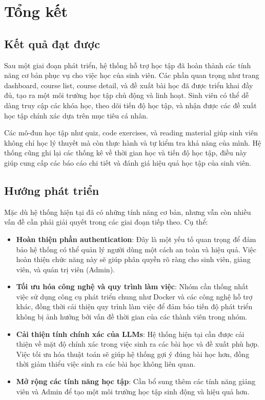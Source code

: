 \chapter{Tổng kết}

\section{Kết quả đạt được}

Sau một giai đoạn phát triển, hệ thống hỗ trợ học tập đã hoàn thành các tính năng cơ bản phục vụ cho việc học của sinh viên. Các phần quan trọng như trang dashboard, course list, course detail, và đề xuất bài học đã được triển khai đầy đủ, tạo ra một môi trường học tập chủ động và linh hoạt. Sinh viên có thể dễ dàng truy cập các khóa học, theo dõi tiến độ học tập, và nhận được các đề xuất học tập chính xác dựa trên mục tiêu cá nhân.

Các mô-đun học tập như quiz, code exercises, và reading material giúp sinh viên không chỉ học lý thuyết mà còn thực hành và tự kiểm tra khả năng của mình. Hệ thống cũng ghi lại các thống kê về thời gian học và tiến độ học tập, điều này giúp cung cấp các báo cáo chi tiết và đánh giá hiệu quả học tập của sinh viên.

\section{Hướng phát triển}

Mặc dù hệ thống hiện tại đã có những tính năng cơ bản, nhưng vẫn còn nhiều vấn đề cần phải giải quyết trong các giai đoạn tiếp theo. Cụ thể:

\begin{itemize}
    \item \textbf{Hoàn thiện phần authentication}: Đây là một yếu tố quan trọng để đảm bảo hệ thống có thể quản lý người dùng một cách an toàn và hiệu quả. Việc hoàn thiện chức năng này sẽ giúp phân quyền rõ ràng cho sinh viên, giảng viên, và quản trị viên (Admin).
    \item \textbf{Tối ưu hóa công nghệ và quy trình làm việc}: Nhóm cần thống nhất việc sử dụng công cụ phát triển chung như Docker và các công nghệ hỗ trợ khác, đồng thời cải thiện quy trình làm việc để đảm bảo tiến độ phát triển không bị ảnh hưởng bởi vấn đề thời gian của các thành viên trong nhóm.
    \item \textbf{Cải thiện tính chính xác của LLMs}: Hệ thống hiện tại cần được cải thiện về mặt độ chính xác trong việc sinh ra các bài học và đề xuất phù hợp. Việc tối ưu hóa thuật toán sẽ giúp hệ thống gợi ý đúng bài học hơn, đồng thời giảm thiểu việc sinh ra các bài học không liên quan.
    \item \textbf{Mở rộng các tính năng học tập}: Cần bổ sung thêm các tính năng giảng viên và Admin để tạo một môi trường học tập sinh động và hiệu quả hơn.
\end{itemize}

